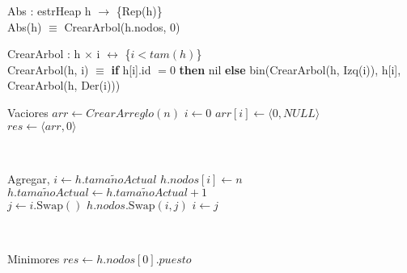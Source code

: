 \documentclass[../main.tex]{subfiles}
\begin{document}
\begin{representacion}
Abs : estrHeap h $\longrightarrow$ \ab[\nat] \hfill \{Rep(h)\}\\
Abs(h) $\equiv$ CrearArbol(h.nodos, 0)

CrearArbol : \ad[\nat] h $\times$ \nat[] i $\longleftrightarrow$ \ab[\nat] \hfill \{$i < tam(h)$\} \\
CrearArbol(h, i) $\equiv$ \textbf{if} h[i].id $= 0$ \textbf{then} nil \textbf{else} bin(CrearArbol(h, Izq(i)), h[i], CrearArbol(h, Der(i)))
\end{representacion}

\begin{algoritmos}

\begin{implementacion}{Vacio}{}{res}{\estrHeap}
\State $arr \gets CrearArreglo(n)$ 
\State $i \gets 0$ 
   
    \State $arr[i] \gets \langle 0, NULL \rangle$ 
\EndWhile
\\
\State $res \gets \langle arr, 0 \rangle$ 

\\
\end{implementacion}

\begin{implementacion}{Agregar}{, }{}{}
\State $i \gets h.tama\tilde{n}oActual$ 
\State $h.nodos[i] \gets n$ 
\State $h.tama\tilde{n}oActual \gets h.tama\tilde{n}oActual + 1$ 
\\
 
    \State $j \gets i.\text{Swap}()$ 
    \State $h.nodos.\text{Swap}(i, j)$ 
    \State $i \gets j$ 
\EndWhile 

\\
\end{implementacion}

\begin{implementacion}{Minimo}{}{res}{{\puntero[puesto]}}
\State $res \gets h.nodos[0].puesto$ 


\end{implementacion}
\end{algoritmos}
\end{document}
